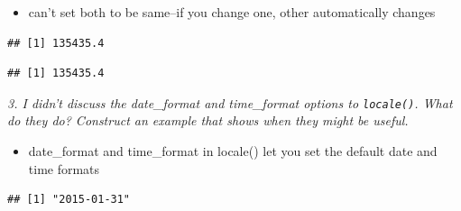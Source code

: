 \documentclass[]{book}
\newenvironment{Shaded}{\begin{snugshade}}{\end{snugshade}}
\newcommand{\DataTypeTok}[1]{\textcolor[rgb]{0.13,0.29,0.53}{#1}}
\newcommand{\KeywordTok}[1]{\textcolor[rgb]{0.13,0.29,0.53}{\textbf{#1}}}
\newcommand{\NormalTok}[1]{#1}
\newcommand{\StringTok}[1]{\textcolor[rgb]{0.31,0.60,0.02}{#1}}
\providecommand{\tightlist}{%
  \setlength{\itemsep}{0pt}\setlength{\parskip}{0pt}}
\theoremstyle{definition}
\theoremstyle{definition}
\theoremstyle{definition}
\theoremstyle{remark}
\begin{document}
\begin{itemize}
\tightlist
\item
  can't set both to be same--if you change one, other automatically
  changes
\end{itemize}

\begin{Shaded}
\end{Shaded}

\begin{verbatim}
## [1] 135435.4
\end{verbatim}

\begin{Shaded}
\end{Shaded}

\begin{verbatim}
## [1] 135435.4
\end{verbatim}

\emph{3. I didn't discuss the date\_format and time\_format options to
\texttt{locale()}. What do they do? Construct an example that shows when
they might be useful.}

\begin{itemize}
\tightlist
\item
  date\_format and time\_format in locale() let you set the default date
  and time formats
\end{itemize}

\begin{Shaded}
\end{Shaded}

\begin{verbatim}
## [1] "2015-01-31"
\end{verbatim}
\end{document}
